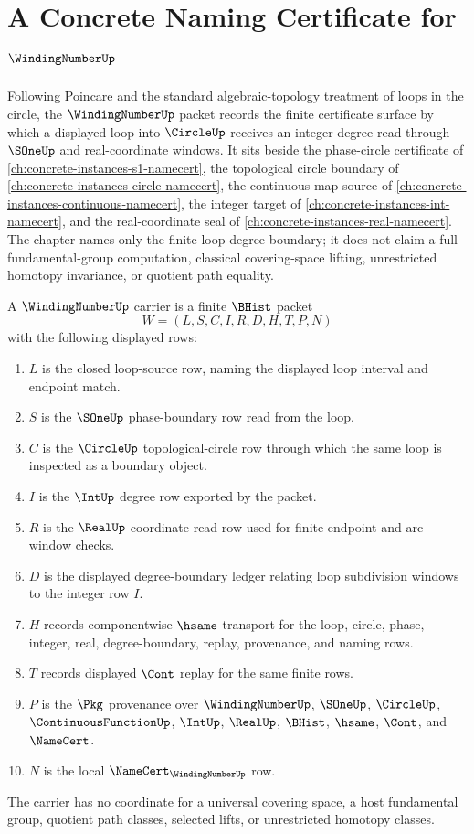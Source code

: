 \chapter{A Concrete Naming Certificate for $\WindingNumberUp$}
\label{ch:concrete-instances-winding-number-namecert}

Following Poincare and the standard algebraic-topology treatment of loops in the circle, the $\WindingNumberUp$ packet records the finite certificate surface by which a displayed loop into $\CircleUp$ receives an integer degree read through $\SOneUp$ and real-coordinate windows. It sits beside the phase-circle certificate of \autoref{ch:concrete-instances-s1-namecert}, the topological circle boundary of \autoref{ch:concrete-instances-circle-namecert}, the continuous-map source of \autoref{ch:concrete-instances-continuous-namecert}, the integer target of \autoref{ch:concrete-instances-int-namecert}, and the real-coordinate seal of \autoref{ch:concrete-instances-real-namecert}. The chapter names only the finite loop-degree boundary; it does not claim a full fundamental-group computation, classical covering-space lifting, unrestricted homotopy invariance, or quotient path equality.

\begin{definition}
\label{def:winding-number-carrier}
A $\WindingNumberUp$ carrier is a finite $\BHist$ packet
$$
W=(L,S,C,I,R,D,H,T,P,N)
$$
with the following displayed rows:
\begin{enumerate}
\item $L$ is the closed loop-source row, naming the displayed loop interval and endpoint match.
\item $S$ is the $\SOneUp$ phase-boundary row read from the loop.
\item $C$ is the $\CircleUp$ topological-circle row through which the same loop is inspected as a boundary object.
\item $I$ is the $\IntUp$ degree row exported by the packet.
\item $R$ is the $\RealUp$ coordinate-read row used for finite endpoint and arc-window checks.
\item $D$ is the displayed degree-boundary ledger relating loop subdivision windows to the integer row $I$.
\item $H$ records componentwise $\hsame$ transport for the loop, circle, phase, integer, real, degree-boundary, replay, provenance, and naming rows.
\item $T$ records displayed $\Cont$ replay for the same finite rows.
\item $P$ is the $\Pkg$ provenance over $\WindingNumberUp$, $\SOneUp$, $\CircleUp$, $\ContinuousFunctionUp$, $\IntUp$, $\RealUp$, $\BHist$, $\hsame$, $\Cont$, and $\NameCert$.
\item $N$ is the local $\NameCert_{\WindingNumberUp}$ row.
\end{enumerate}
The carrier has no coordinate for a universal covering space, a host fundamental group, quotient path classes, selected lifts, or unrestricted homotopy classes.
\end{definition}

